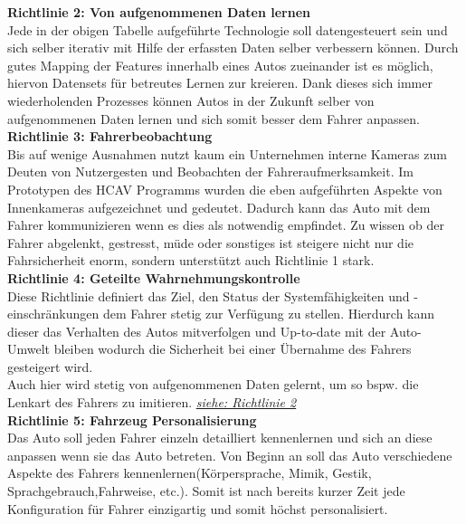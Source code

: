 \textbf{Richtlinie 2: Von aufgenommenen Daten lernen} \\
Jede in der obigen Tabelle aufgeführte Technologie soll datengesteuert sein und sich selber iterativ mit Hilfe der erfassten Daten selber verbessern können. Durch gutes Mapping der Features innerhalb eines Autos zueinander ist es möglich, hiervon Datensets für betreutes Lernen zur kreieren. \label{sec:rl2}Dank dieses sich immer wiederholenden Prozesses können Autos in der Zukunft selber von aufgenommenen Daten lernen und sich somit besser dem Fahrer anpassen.\\

\textbf{Richtlinie 3: Fahrerbeobachtung}\\
Bis auf wenige Ausnahmen nutzt kaum ein Unternehmen interne Kameras zum Deuten von Nutzergesten und Beobachten der Fahreraufmerksamkeit. Im Prototypen des HCAV Programms wurden die eben aufgeführten Aspekte von Innenkameras aufgezeichnet und gedeutet. Dadurch kann das Auto mit dem Fahrer kommunizieren wenn es dies als notwendig empfindet. Zu wissen ob der Fahrer abgelenkt, gestresst, müde oder sonstiges ist steigere nicht nur die Fahrsicherheit enorm, sondern unterstützt auch Richtlinie 1 stark.\\

\textbf{Richtlinie 4: Geteilte Wahrnehmungskontrolle}\\
Diese Richtlinie definiert das Ziel, den Status der Systemfähigkeiten und -einschränkungen dem Fahrer stetig zur Verfügung zu stellen. Hierdurch kann dieser das Verhalten des Autos mitverfolgen und Up-to-date mit der Auto-Umwelt bleiben wodurch die Sicherheit bei einer Übernahme des Fahrers gesteigert wird.\\
Auch hier wird stetig von aufgenommenen Daten gelernt, um so bspw. die Lenkart des Fahrers zu imitieren. \textit{\hyperref[sec:rl2]{siehe: Richtlinie 2}}
\\

\textbf{Richtlinie 5: Fahrzeug Personalisierung}\\
Das Auto soll jeden Fahrer einzeln detailliert kennenlernen und sich an diese anpassen wenn sie das Auto betreten. Von Beginn an soll das Auto verschiedene Aspekte des Fahrers kennenlernen(Körpersprache, Mimik, Gestik, Sprachgebrauch,Fahrweise, etc.). Somit ist nach bereits kurzer Zeit jede Konfiguration für Fahrer einzigartig und somit höchst personalisiert.
\\

